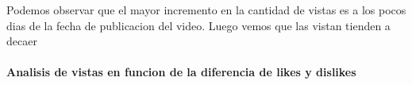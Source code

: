            \begin{figure}[ht]
            \end{figure}
        \FloatBarrier
        Podemos observar que el mayor incremento en la cantidad de vistas es a
        los pocos dias de la fecha de publicacion del video. Luego vemos que
        las vistan tienden a decaer

        \newpage
        \paragraph{Analisis de vistas en funcion de la diferencia de likes y dislikes}

